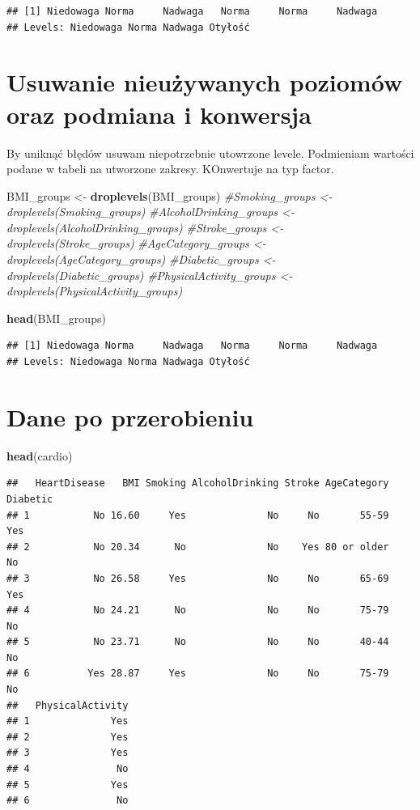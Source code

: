 \documentclass[
]{article}
\newenvironment{Shaded}{\begin{snugshade}}{\end{snugshade}}
\newcommand{\CommentTok}[1]{\textcolor[rgb]{0.56,0.35,0.01}{\textit{#1}}}
\newcommand{\FunctionTok}[1]{\textcolor[rgb]{0.13,0.29,0.53}{\textbf{#1}}}
\newcommand{\NormalTok}[1]{#1}
\newcommand{\OtherTok}[1]{\textcolor[rgb]{0.56,0.35,0.01}{#1}}
\begin{document}
\begin{verbatim}
## [1] Niedowaga Norma     Nadwaga   Norma     Norma     Nadwaga  
## Levels: Niedowaga Norma Nadwaga Otyłość
\end{verbatim}

\section{Usuwanie nieużywanych poziomów oraz podmiana i
konwersja}\label{usuwanie-nieuux17cywanych-poziomuxf3w-oraz-podmiana-i-konwersja}

By uniknąć błędów usuwam niepotrzebnie utowrzone levele. Podmieniam
wartości podane w tabeli na utworzone zakresy. KOnwertuje na typ factor.

\begin{Shaded}
\begin{Highlighting}[]
\NormalTok{BMI\_groups }\OtherTok{\textless{}{-}} \FunctionTok{droplevels}\NormalTok{(BMI\_groups)}
\CommentTok{\#Smoking\_groups \textless{}{-} droplevels(Smoking\_groups)}
\CommentTok{\#AlcoholDrinking\_groups \textless{}{-} droplevels(AlcoholDrinking\_groups)}
\CommentTok{\#Stroke\_groups \textless{}{-} droplevels(Stroke\_groups)}
\CommentTok{\#AgeCategory\_groups \textless{}{-} droplevels(AgeCategory\_groups)}
\CommentTok{\#Diabetic\_groups \textless{}{-} droplevels(Diabetic\_groups)}
\CommentTok{\#PhysicalActivity\_groups \textless{}{-} droplevels(PhysicalActivity\_groups)}


\FunctionTok{head}\NormalTok{(BMI\_groups)}
\end{Highlighting}
\end{Shaded}

\begin{verbatim}
## [1] Niedowaga Norma     Nadwaga   Norma     Norma     Nadwaga  
## Levels: Niedowaga Norma Nadwaga Otyłość
\end{verbatim}

\section{Dane po przerobieniu}\label{dane-po-przerobieniu}

\begin{Shaded}
\begin{Highlighting}[]
\FunctionTok{head}\NormalTok{(cardio)}
\end{Highlighting}
\end{Shaded}

\begin{verbatim}
##   HeartDisease   BMI Smoking AlcoholDrinking Stroke AgeCategory Diabetic
## 1           No 16.60     Yes              No     No       55-59      Yes
## 2           No 20.34      No              No    Yes 80 or older       No
## 3           No 26.58     Yes              No     No       65-69      Yes
## 4           No 24.21      No              No     No       75-79       No
## 5           No 23.71      No              No     No       40-44       No
## 6          Yes 28.87     Yes              No     No       75-79       No
##   PhysicalActivity
## 1              Yes
## 2              Yes
## 3              Yes
## 4               No
## 5              Yes
## 6               No
\end{verbatim}
\end{document}
